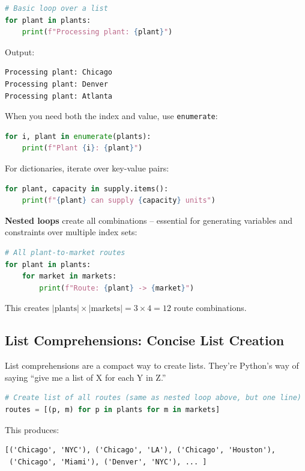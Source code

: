 \begin{lstlisting}[language=Python]
# Basic loop over a list
for plant in plants:
    print(f"Processing plant: {plant}")
\end{lstlisting}

Output:
\begin{verbatim}
Processing plant: Chicago
Processing plant: Denver
Processing plant: Atlanta
\end{verbatim}

When you need both the index and value, use \texttt{enumerate}:

\begin{lstlisting}[language=Python]
for i, plant in enumerate(plants):
    print(f"Plant {i}: {plant}")
\end{lstlisting}

For dictionaries, iterate over key-value pairs:

\begin{lstlisting}[language=Python]
for plant, capacity in supply.items():
    print(f"{plant} can supply {capacity} units")
\end{lstlisting}

\textbf{Nested loops} create all combinations -- essential for generating variables and constraints over multiple index sets:

\begin{lstlisting}[language=Python]
# All plant-to-market routes
for plant in plants:
    for market in markets:
        print(f"Route: {plant} -> {market}")
\end{lstlisting}

This creates $|\text{plants}| \times |\text{markets}| = 3 \times 4 = 12$ route combinations.

\subsection{List Comprehensions: Concise List Creation}

List comprehensions are a compact way to create lists. They're Python's way of saying ``give me a list of X for each Y in Z.''

\begin{lstlisting}[language=Python]
# Create list of all routes (same as nested loop above, but one line)
routes = [(p, m) for p in plants for m in markets]
\end{lstlisting}

This produces:
\begin{verbatim}
[('Chicago', 'NYC'), ('Chicago', 'LA'), ('Chicago', 'Houston'),
 ('Chicago', 'Miami'), ('Denver', 'NYC'), ... ]
\end{verbatim}

